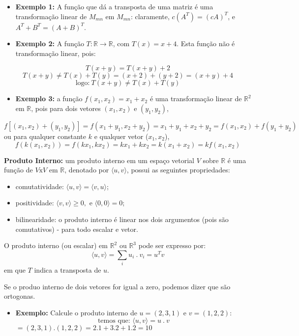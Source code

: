 \documentclass[
  openany]{book}
\providecommand{\tightlist}{%
  \setlength{\itemsep}{0pt}\setlength{\parskip}{0pt}}
\begin{document}
\begin{itemize}
\item
  \textbf{Exemplo 1:} A função que dá a transposta de uma matriz é uma transformação linear de \(M_{mn}\) em \(M_{mn}\): claramente, \(c(A^T)=(cA)^T\), e \(A^T+B^T=(A+B)^T\).
\item
  \textbf{Exemplo 2:} A função \(T:\mathbb{R}\rightarrow \mathbb{R}\), com \(T(x)=x+4\). Esta função não é transformação linear, pois:
\end{itemize}

\[T(x+y)=T(x+y)+2\]
\[T(x+y)\neq T(x)+T(y)=(x+2)+(y+2)=(x+y)+4\]
\[\mbox{logo:} \ T(x+y)\neq T(x)+T(y)\]

\begin{itemize}
\tightlist
\item
  \textbf{Exemplo 3:} a função \(f(x_1,x_2)=x_1+x_2\) é uma transformação linear de \(\mathbb{R}^2\) em \(\mathbb{R}\), pois para dois vetores \((x_1,x_2)\) e \((y_1,y_2)\),
\end{itemize}

\[f[(x_1,x_2)+(y_1,y_2)]=f(x_1+y_1,x_2+y_2)=x_1+y_1+x_2+y_2=f(x_1,x_2)+f(y_1+y_2)\]
ou para qualquer constante \(k\) e qualquer vetor (\(x_1,x_2\)),
\[f(k(x_1,x_2))=f(kx_1,kx_2)=kx_1+kx_2=k(x_1+x_2)=kf(x_1,x_2)\]

\textbf{Produto Interno:} um produto interno em um espaço vetorial \(V\) sobre \(\mathbb{R}\) é uma função de \(V \mbox{x} V\) em \(\mathbb{R}\), denotado por \(\langle u,v \rangle\), possui as seguintes propriedades:

\begin{itemize}
\tightlist
\item
  comutatividade: \(\langle u,v \rangle=\langle v,u \rangle\);
\item
  positividade: \(\langle v,v \rangle \geq 0,\) e \(\langle 0,0 \rangle =0\);
\item
  bilinearidade: o produto interno é linear nos dois argumentos (pois são comutativos) - para todo escalar e vetor.
\end{itemize}

O produto interno (ou escalar) em \(\mathbb{R}^2\) ou \(\mathbb{R}^3\) pode ser expresso por:
\[\langle u,v \rangle =\sum_i u_i \ . \  v_i = u^Tv\]
em que \(T\) indica a transposta de \(u\).

Se o produo interno de dois vetores for igual a zero, podemos dizer que são ortogonas.

\begin{itemize}
\tightlist
\item
  \textbf{Exemplo:} Calcule o produto interno de \(u=(2,3,1)\) e \(v=(1,2,2)\):
  \[\mbox{temos que: }\langle u,v \rangle =u \ . \  v\]
  \(=(2,3,1).(1,2,2)=2.1+3.2+1.2=10\)
\end{itemize}
\end{document}
